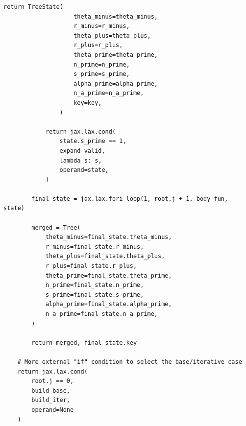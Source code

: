 \documentclass[a4paper,12pt]{article}
\begin{document}
\begin{lstlisting}[xleftmargin=-1.5cm, xrightmargin=-1.5cm, linewidth=1.05\textwidth]
				return TreeState(
					theta_minus=theta_minus,
					r_minus=r_minus,
					theta_plus=theta_plus,
					r_plus=r_plus,
					theta_prime=theta_prime,
					n_prime=n_prime,
					s_prime=s_prime,
					alpha_prime=alpha_prime,
					n_a_prime=n_a_prime,
					key=key,
				)

			return jax.lax.cond(
				state.s_prime == 1,
				expand_valid,
				lambda s: s,
				operand=state,
			)

		final_state = jax.lax.fori_loop(1, root.j + 1, body_fun, state)

		merged = Tree(
			theta_minus=final_state.theta_minus,
			r_minus=final_state.r_minus,
			theta_plus=final_state.theta_plus,
			r_plus=final_state.r_plus,
			theta_prime=final_state.theta_prime,
			n_prime=final_state.n_prime,
			s_prime=final_state.s_prime,
			alpha_prime=final_state.alpha_prime,
			n_a_prime=final_state.n_a_prime,
		)

		return merged, final_state.key
		
	# More external "if" condition to select the base/iterative case
	return jax.lax.cond(
		root.j == 0,
		build_base,
		build_iter,
		operand=None
	)
\end{lstlisting}
\end{document}
